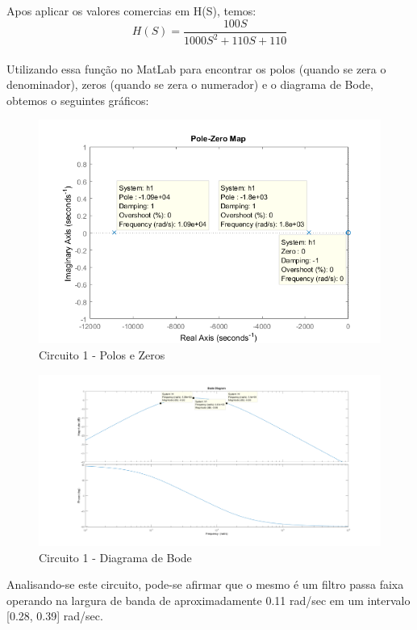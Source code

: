 \documentclass[a4paper, 12pt]{article}
\begin{document}
			Apos aplicar os valores comercias em H(S), temos:
			\[
			H(S) = \frac{100S}{1000S^{2} + 110S + 110}
			\] 	\\					
			
			Utilizando essa função no MatLab para encontrar os polos (quando se zera o denominador), zeros (quando se zera o numerador) e o diagrama de Bode, obtemos o seguintes gráficos:
			
			\begin{figure}[!ht]
				\centering
				\includegraphics[scale=0.7]{img/1e_circ1.png}
				\caption{Circuito 1 - Polos e Zeros}	
			\end{figure}	
			
			\begin{figure}[!ht]
				\centering
				\includegraphics[scale=0.9]{img/1f_circ1.png}
				\caption{Circuito 1 - Diagrama de Bode}	
			\end{figure}						
											
			Analisando-se este circuito, pode-se afirmar que o mesmo é um filtro passa faixa operando na largura de banda de aproximadamente 0.11 rad/sec em um intervalo [0.28, 0.39] rad/sec.
			\newpage
\end{document}
